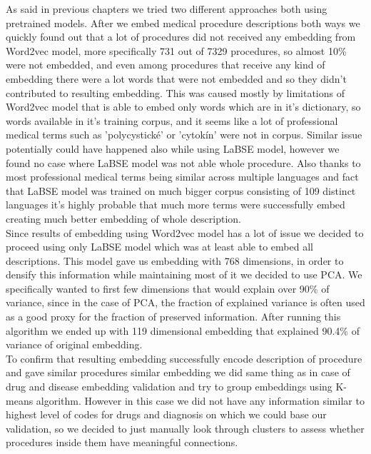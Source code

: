 As said in previous chapters we tried two different approaches both using pretrained models. After we embed medical procedure descriptions both ways we quickly found out that a lot of procedures did not received any embedding from Word2vec model, more specifically 731 out of 7329 procedures, so almost 10\% were not embedded, and even among procedures that receive any kind of embedding there were a lot words that were not embedded and so they didn't contributed to resulting embedding. This was caused mostly by limitations of Word2vec model that is able to embed only words which are in it's dictionary, so words available in it's training corpus, and it seems like a lot of professional medical terms such as 'polycystické' or 'cytokín' were not in corpus. Similar issue potentially could have happened also while using LaBSE model, however we found no case where LaBSE model was not able whole procedure. Also thanks to most professional medical terms being similar across multiple languages and fact that LaBSE model was trained on much bigger corpus consisting of 109 distinct languages it's highly probable that much more terms were successfully embed creating much better embedding of whole description. 
\\

Since results of embedding using Word2vec model has a lot of issue we decided to proceed using only LaBSE model which was at least able to embed all descriptions. This model gave us embedding with 768 dimensions, in order to densify this information while maintaining most of it we decided to use PCA. We specifically wanted to first few dimensions that would explain over 90\% of variance, since in the case of PCA, the fraction of explained variance is often used as a good proxy for the fraction of preserved information. After running this algorithm we ended up with 119 dimensional embedding that explained 90.4\% of variance of original embedding.
\\

To confirm that resulting embedding successfully encode description of procedure and gave similar procedures similar embedding we did same thing as in case of drug and disease embedding validation and try to group embeddings using K-means algorithm. However in this case we did not have any information similar to highest level of codes for drugs and diagnosis on which we could base our validation, so we decided to just manually look through clusters to assess whether procedures inside them have meaningful connections.
\\

